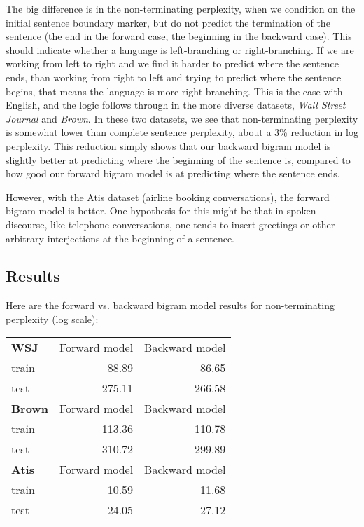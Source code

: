 \documentclass[10pt]{article}
\begin{document}
The big difference is in the non-terminating perplexity, when we condition on the initial sentence boundary marker, but do not predict the termination of the sentence (the end in the forward case, the beginning in the backward case). This should indicate whether a language is left-branching or right-branching. If we are working from left to right and we find it harder to predict where the sentence ends, than working from right to left and trying to predict where the sentence begins, that means the language is more right branching. This is the case with English, and the logic follows through in the more diverse datasets, \emph{Wall Street Journal} and \emph{Brown}. In these two datasets, we see that non-terminating perplexity is somewhat lower than complete sentence perplexity, about a 3\% reduction in log perplexity. This reduction simply shows that our backward bigram model is slightly better at predicting where the beginning of the sentence is, compared to how good our forward bigram model is at predicting where the sentence ends.

However, with the Atis dataset (airline booking conversations), the forward bigram model is better. One hypothesis for this might be that in spoken discourse, like telephone conversations, one tends to insert greetings or other arbitrary interjections at the beginning of a sentence.

\subsection{Results}

Here are the forward vs. backward bigram model results for non-terminating perplexity (log scale):

\medskip
\begin{tabular}{lrr}
  \textbf{WSJ} & Forward model & Backward model \\
  train &  88.89 &  86.65 \\
  test  & 275.11 & 266.58 \\
  \midrule
  \textbf{Brown} & Forward model & Backward model \\
  train & 113.36 & 110.78 \\
  test  & 310.72 & 299.89 \\
  \midrule
  \textbf{Atis} & Forward model & Backward model \\
  train & 10.59 & 11.68 \\
  test  & 24.05 & 27.12 \\
\end{tabular}
\medskip
\end{document}

